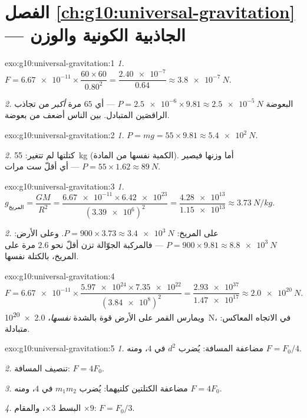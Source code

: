 \section*{الفصل \ref{ch:g10:universal-gravitation} --- الجاذبية الكونية والوزن}

\begin{solution}{exo:g10:universal-gravitation:1}
\emph{1.} $F = \num{6.67e-11} \times \dfrac{60 \times 60}{0.80^2}
= \dfrac{\num{2.40e-7}}{0.64} \approx \qty{3.8e-7}{N}$.

\emph{2.}  البعوضة
$P = \num{2.5e-6} \times 9.81 \approx \qty{2.5e-5}{N}$ --- أي $65$
مرة \emph{أكبر} من تجاذب الراقصَين المتبادل. 
بين الناس أضعف من  بعوضة.
\end{solution}

\begin{solution}{exo:g10:universal-gravitation:2}
\emph{1.} $P = mg = 55 \times 9.81 \approx \qty{5.4e2}{N}$.

\emph{2.} كتلتها لم تتغير: \qty{55}{kg} (الكمية نفسها من
المادة). أما وزنها فيصير
$P = 55 \times 1.62 \approx \qty{89}{N}$ --- أي أقلّ ست مرات.
\end{solution}

\begin{solution}{exo:g10:universal-gravitation:3}
\emph{1.} $g_{\text{المريخ}} = \dfrac{G M}{R^2}
= \dfrac{\num{6.67e-11} \times \num{6.42e23}}{(\num{3.39e6})^2}
= \dfrac{\num{4.28e13}}{\num{1.15e13}} \approx \qty{3.73}{N/kg}$.

\emph{2.} على المريخ: $P = 900 \times 3.73 \approx \qty{3.4e3}{N}$. وعلى
الأرض: $P = 900 \times 9.81 \approx \qty{8.8e3}{N}$ --- فالمركبة الجوّالة
تزن أقلّ نحو $2.6$ مرة على المريخ، بالكتلة نفسها.
\end{solution}

\begin{solution}{exo:g10:universal-gravitation:4}
\[
F = \num{6.67e-11} \times
\frac{\num{5.97e24} \times \num{7.35e22}}{(\num{3.84e8})^2}
= \frac{\num{2.93e37}}{\num{1.47e17}}
\approx \qty{2.0e20}{N}.
\]
ويمارس القمر على الأرض قوة بالشدة \emph{نفسها}،
\qty{2.0e20}{N}، في الاتجاه المعاكس:  متبادلة.
\end{solution}

\begin{solution}{exo:g10:universal-gravitation:5}
\emph{1.} مضاعفة المسافة: يُضرب $d^2$ في $4$، ومنه
$F = F_0/4$.

\emph{2.} تنصيف المسافة: $F = 4F_0$.

\emph{3.} مضاعفة الكتلتين كلتيهما: يُضرب $m_1 m_2$ في $4$، ومنه
$F = 4F_0$.

\emph{4.} البسط $\times 3$، والمقام $\times 9$:
$F = F_0/3$.
\end{solution}

